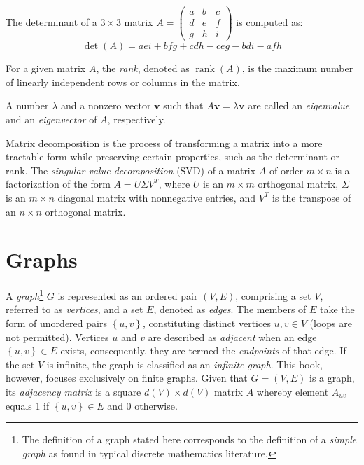 \begin{example}
The determinant of a $3 \times 3$ matrix $A = \left( \begin{smallmatrix} a & b & c \\ d & e & f \\ g & h & i \end{smallmatrix} \right)$ is computed as:
\[
\det(A) = aei + bfg + cdh - ceg - bdi - afh
\]
\end{example}

For a given matrix $A$, the \emph{rank}, denoted as $\operatorname{rank}(A)$, is the maximum number of linearly independent rows or columns in the matrix.

A number $\lambda$ and a nonzero vector $\mathbf{v}$ such that $A \mathbf{v} = \lambda \mathbf{v}$ are called an \emph{eigenvalue} and an \emph{eigenvector} of $A$, respectively.

Matrix decomposition is the process of transforming a matrix into a more tractable form while preserving certain properties, such as the determinant or rank. The \emph{singular value decomposition} (SVD) of a matrix $A$ of order $m \times n$ is a factorization of the form $A = U \Sigma V^T$, where $U$ is an $m \times m$ orthogonal matrix, $\Sigma$ is an $m \times n$ diagonal matrix with nonnegative entries, and $V^T$ is the transpose of an $n \times n$ orthogonal matrix.

%
%

\section{Graphs}
\label{sec:Graphs}

A \emph{graph}\footnote{The definition of a graph stated here corresponds to the definition of a \emph{simple graph} as found in typical discrete mathematics literature.} $G$ is represented as an ordered pair $(V,E)$, comprising a set $V$, referred to as \emph{vertices}, and a set $E$, denoted as \emph{edges}. The members of $E$ take the form of unordered pairs $\left\{ u,v\right\}$, constituting distinct vertices $u,v\in V$ (loops are not permitted). Vertices $u$ and $v$ are described as \emph{adjacent} when an edge $\left\{ u,v\right\} \in E$ exists, consequently, they are termed the \emph{endpoints} of that edge. If the set $V$ is infinite, the graph is classified as an \emph{infinite graph}. This book, however, focuses exclusively on finite graphs. Given that $G = (V,E)$ is a graph, its \emph{adjacency matrix} is a square $d(V) \times d(V)$ matrix $A$ whereby element $A_{uv}$ equals 1 if $\left\{ u,v\right\} \in E$ and 0 otherwise.

